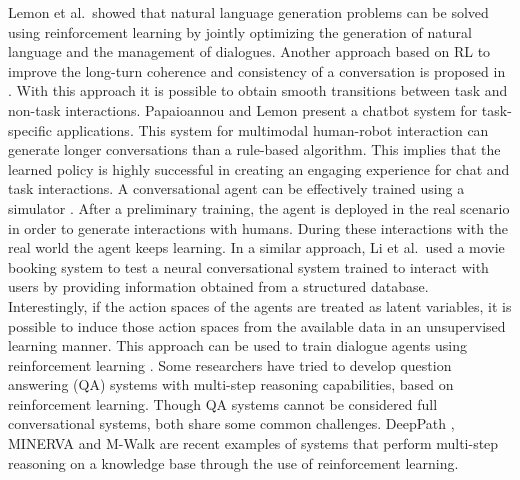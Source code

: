 Lemon et al.\  showed that natural language generation problems can be solved using reinforcement learning by jointly optimizing the generation of natural language and the management of dialogues. Another approach  based on RL to improve the long-turn coherence and consistency of a conversation is proposed in . With this approach it is possible to obtain smooth transitions between task and non-task interactions. Papaioannou and Lemon  present a chatbot system for task-specific applications. This system for multimodal human-robot interaction can generate longer conversations than a rule-based algorithm. This implies that the learned policy is highly successful in creating an engaging experience for chat and task interactions. A conversational agent can be effectively trained using a simulator . After a preliminary training, the agent is deployed in the real scenario in order to generate interactions with humans. During these interactions with the real world the agent keeps learning. In a similar approach, Li et al.\  used a movie booking system to test a neural conversational system trained to interact with users by providing information obtained from a structured database. Interestingly, if the action spaces of the agents are treated as latent variables, it is possible to induce those action spaces from the available data in an unsupervised learning manner. This approach can be used to train dialogue agents using reinforcement learning .
Some researchers have tried to develop question answering (QA) systems with multi-step reasoning capabilities, based on reinforcement learning. Though QA systems cannot be considered full conversational systems, both share some common challenges. DeepPath , MINERVA  and M-Walk  are recent examples of systems that perform multi-step reasoning on a knowledge base through the use of reinforcement learning.
